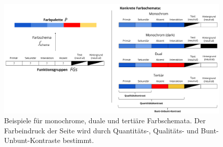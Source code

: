 \begin{figure}[h]
	\centering
	\includegraphics[width=1\textwidth]{img/colorschemes.png}
	\caption{Beispiele für monochrome, duale und tertiäre Farbschemata. Der Farbeindruck der Seite wird durch Quantitäts-, Qualitäts- und Bunt-Unbunt-Kontraste bestimmt.}
	\label{fig:colorschemes}
\end{figure}